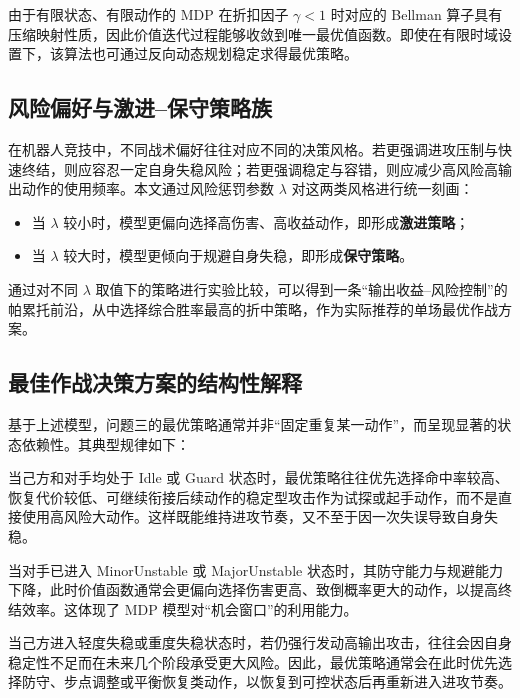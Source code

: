 由于有限状态、有限动作的 MDP 在折扣因子 \(\gamma<1\) 时对应的 Bellman 算子具有压缩映射性质，因此价值迭代过程能够收敛到唯一最优值函数。即使在有限时域设置下，该算法也可通过反向动态规划稳定求得最优策略。

\subsection{风险偏好与激进--保守策略族}

在机器人竞技中，不同战术偏好往往对应不同的决策风格。若更强调进攻压制与快速终结，则应容忍一定自身失稳风险；若更强调稳定与容错，则应减少高风险高输出动作的使用频率。本文通过风险惩罚参数 \(\lambda\) 对这两类风格进行统一刻画：

\begin{itemize}
    \item 当 \(\lambda\) 较小时，模型更偏向选择高伤害、高收益动作，即形成\textbf{激进策略}；
    \item 当 \(\lambda\) 较大时，模型更倾向于规避自身失稳，即形成\textbf{保守策略}。
\end{itemize}

通过对不同 \(\lambda\) 取值下的策略进行实验比较，可以得到一条“输出收益--风险控制”的帕累托前沿，从中选择综合胜率最高的折中策略，作为实际推荐的单场最优作战方案。

\subsection{最佳作战决策方案的结构性解释}

基于上述模型，问题三的最优策略通常并非“固定重复某一动作”，而呈现显著的状态依赖性。其典型规律如下：

当己方和对手均处于 Idle 或 Guard 状态时，最优策略往往优先选择命中率较高、恢复代价较低、可继续衔接后续动作的稳定型攻击作为试探或起手动作，而不是直接使用高风险大动作。这样既能维持进攻节奏，又不至于因一次失误导致自身失稳。

当对手已进入 MinorUnstable 或 MajorUnstable 状态时，其防守能力与规避能力下降，此时价值函数通常会更偏向选择伤害更高、致倒概率更大的动作，以提高终结效率。这体现了 MDP 模型对“机会窗口”的利用能力。

当己方进入轻度失稳或重度失稳状态时，若仍强行发动高输出攻击，往往会因自身稳定性不足而在未来几个阶段承受更大风险。因此，最优策略通常会在此时优先选择防守、步点调整或平衡恢复类动作，以恢复到可控状态后再重新进入进攻节奏。

